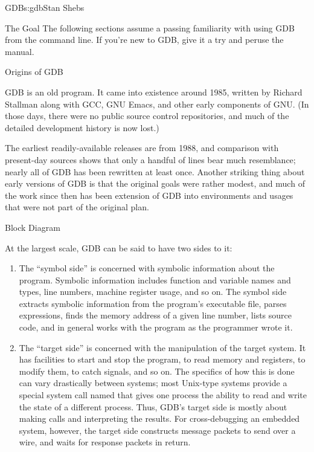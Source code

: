 \begin{aosachapter}{GDB}{s:gdb}{Stan Shebs}
\begin{aosasect1}{The Goal}
The following sections assume a passing familiarity with using GDB
from the command line. If you're new to GDB, give it a try and peruse
the manual.\cite{bib:gdb-manual}

\end{aosasect1}

\begin{aosasect1}{Origins of GDB}

GDB is an old program.  It came into existence around 1985, written by
Richard Stallman along with GCC, GNU Emacs, and other early components
of GNU.  (In those days, there were no public source control
repositories, and much of the detailed development history is now
lost.)

The earliest readily-available releases are from 1988, and comparison
with present-day sources shows that only a handful of lines bear much
resemblance; nearly all of GDB has been rewritten at least once.
Another striking thing about early versions of GDB is that the
original goals were rather modest, and much of the work since then has
been extension of GDB into environments and usages that were not part
of the original plan.

\end{aosasect1}

\begin{aosasect1}{Block Diagram}


At the largest scale, GDB can be said to have two sides to it:

\begin{enumerate}
\item The ``symbol side'' is concerned with symbolic information about
the program.  Symbolic information includes function and variable
names and types, line numbers, machine register usage, and so on.
The symbol side extracts symbolic information from the program's
executable file, parses expressions, finds the memory address of a
given line number, lists source code, and in general works with
the program as the programmer wrote it.

\item The ``target side'' is concerned with the manipulation of the
target system.  It has facilities to start and stop the program, to
read memory and registers, to modify them, to catch signals, and so
on.  The specifics of how this is done can vary drastically between
systems; most Unix-type systems provide a special system call named
 that gives one process the ability to read and write the
state of a different process. Thus, GDB's target side is
mostly about making  calls and interpreting the results.
For cross-debugging an embedded system, however, the target side constructs
message packets to send over a wire, and waits for response packets in
return.
\end{enumerate}


\end{aosasect1}
\end{aosachapter}
